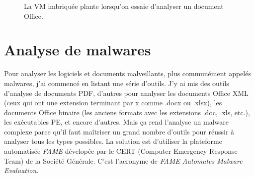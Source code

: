 \begin{figure}
    \centering
    \caption{La VM imbriquée plante lorsqu'on essaie d'analyser un document Office.}
    \label{fig:sandbox-fail}
\end{figure}










\section{Analyse de malwares}

Pour analyser les logiciels et documents malveillants, plus communément appelés malwares, j'ai commencé en listant une série d'outils. J'y ai mis des outils d'analyse de documents PDF, d'autres pour analyser les documents Office XML (ceux qui ont une extension terminant par x comme .docx ou .xlsx), les documents Office binaire (les anciens formats avec les extensions .doc, .xls, etc.), les exécutables PE, et encore d'autres. Mais ça rend l'analyse un malware complexe parce qu'il faut maîtriser un grand nombre d'outils pour réussir à analyser tous les types possibles. La solution est d'utiliser la plateforme automatisée \textit{FAME} dévelopée par le CERT (Computer Emergency Response Team) de la Société Générale. C'est l'acronyme de \textit{FAME Automates Malware Evaluation}.

